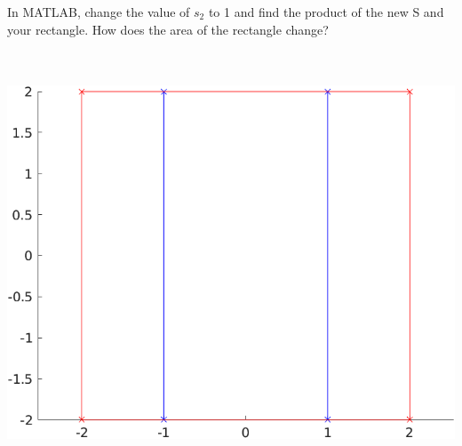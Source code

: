 In MATLAB, change the value of $s_2$ to 1 and find the product of the new S and your rectangle. How does the area of the rectangle change?

\begin{solution} \ \\
    \ \\
    \includegraphics{img/e7p6.png}
\end{solution}